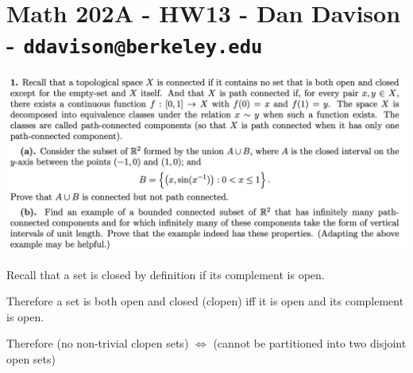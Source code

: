 \section*{Math 202A - HW13 - Dan Davison - \texttt{ddavison@berkeley.edu}}

\begin{mdframed}
\includegraphics[width=400pt]{img/analysis--berkeley-202a-hw13-26dd.png}
\end{mdframed}

Recall that a set is closed by definition if its complement is open.

Therefore a set is both open and closed (clopen) iff it is open and its complement is open.

Therefore (no non-trivial clopen sets) $\iff$ (cannot be partitioned into two disjoint open sets)

